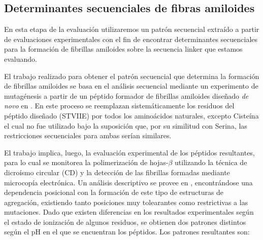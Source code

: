 \subsection{Determinantes secuenciales de fibras amiloides}\label{determinantesSecuenciales}

En esta etapa de la evaluación utilizaremos un patrón secuencial extraído a partir de evaluaciones experimentales \cite{de2004sequence} 
con el fin de encontrar determinantes secuenciales para la formación de fibrillas amiloides sobre la secuencia linker que estamos evaluando.

El trabajo realizado para obtener el patrón secuencial que determina la formación de fibrillas amiloides se basa en el análisis secuencial mediante 
un experimento de mutagénesis a partir de un péptido formador de fibrillas amiloides diseñado \textit{de novo} en \cite{de2002novo}. 
En este proceso se reemplazan
sistemáticamente los residuos del péptido diseñado (STVIIE) por todos 
los aminoácidos naturales, excepto Cisteína el cual no fue utilizado bajo la suposición que, por su similitud con Serina, las restricciones secuenciales para ambas serían similares.

El trabajo implica, luego, la evaluación experimental de los péptidos resultantes, para lo cual se monitorea la polimerización de hojas-$\beta$ utilizando la técnica de dicroísmo circular (CD) y la detección de las fibrillas formadas mediante 
microcopía electrónica. Un análisis descriptivo se provee en \cite{de2004sequence}, encontrándose una dependencia posicional con la formación de este tipo de estructuras de agregación, existiendo tanto posiciones muy tolearantes como 
restrictivas a las mutaciones.
Dado que existen diferencias en los resultados experimentales según el estado de ionización de algunos residuos, se obtienen dos patrones distintos según el pH en el que se encuentran los péptidos.
Los patrones resultantes son:
\vspace{0.2cm}

